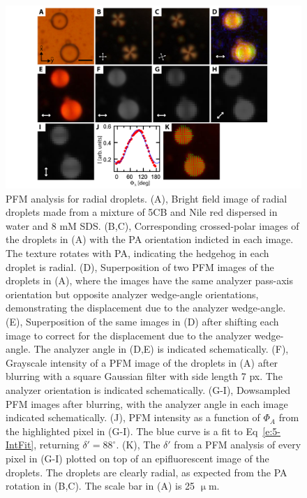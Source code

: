 \begin{figure}
  \centering
  \includegraphics{figures/C5/Ch5-Figs_PFM_Spheres.png}
  \caption{PFM analysis for radial droplets.
  (A), Bright field image of radial droplets made from a mixture of 5CB and Nile red dispersed in water and 8 mM SDS.
  (B,C), Corresponding crossed-polar images of the droplets in (A) with the PA orientation indicted in each image.
  The texture rotates with PA, indicating the hedgehog in each droplet is radial.
  (D), Superposition of two PFM images of the droplets in (A), where the images have the same analyzer pass-axis orientation but opposite analyzer wedge-angle orientations, demonstrating the displacement due to the analyzer wedge-angle.
  (E), Superposition of the same images in (D) after shifting each image to correct for the displacement due to the analyzer wedge-angle.
  The analyzer angle in (D,E) is indicated schematically.
  (F), Grayscale intensity of a PFM image of the droplets in (A) after blurring with a square Gaussian filter with side length 7 px.
  The analyzer orientation is indicated schematically.
  (G-I), Dowsampled PFM images after blurring, with the analyzer angle in each image indicated schematically.
  (J), PFM intensity as a function of $\Phi_A$ from the highlighted pixel in (G-I).
  The blue curve is a fit to Eq~\ref{e:5-IntFit}, returning $\delta' = 88^{\circ}$.
  (K), The $\delta'$ from a PFM analysis of every pixel in (G-I) plotted on top of an epifluorescent image of the droplets.
  The droplets are clearly radial, as expected from the PA rotation in (B,C).
  The scale bar in (A) is 25 $\upmu$m.}\label{f:5-PFM_Spheres}
\end{figure}

